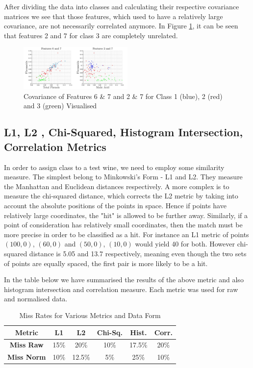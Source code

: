\documentclass[10pt,twocolumn,letterpaper]{article}
\begin{document}
 
After dividing the data into classes and calculating their respective covariance matrices we see that those features, which used to have a relatively large covariance, are not necessarily correlated anymore. In Figure \ref{fig:covIdv}, it can be seen that features 2 and 7 for class 3 are completely unrelated.

\begin{figure}[H]
\centering
\includegraphics[width=0.5\textwidth]{../results/Q1_covIdv}
\caption{Covariance of Features 6 \& 7 and 2 \& 7  for Class 1 (blue), 2 (red) and 3 (green) Visualised \label{fig:covIdv}}
\end{figure}

\subsection{L1, L2 , Chi-Squared, Histogram Intersection, Correlation Metrics}

In order to assign class to a test wine, we need to employ some similarity measure. The simplest belong to Minkowski's Form - L1 and L2. They measure the Manhattan and Euclidean distances respectively. A more complex is to measure the chi-squared distance, which corrects the L2 metric by taking into account the absolute positions of the points in space. Hence if points have relatively large coordinates, the "hit" is allowed to be further away. Similarly, if a point of consideration has relatively small coordinates, then the match must be more precise in order to be classified as a hit. For instance an L1 metric of points $(100,0)$, $(60,0)$ and $(50,0)$, $(10,0)$ would yield 40 for both. However chi-squared distance is 5.05 and 13.7 respectively, meaning even though the two sets of points are equally spaced, the first pair is more likely to be a hit.

In the table below we have summarised the results of the above metric and also histogram intersection and correlation measure. Each metric was used for raw and normalised data.

\begin{table}[H]
\caption{Miss Rates for Various Metrics and Data Form \label{tab:MissMetric}}
\small
\begin{center}
\begin{tabular}{|c| c c c c c|}
\hline
\bf Metric & L1 & L2 & Chi-Sq. &  Hist. & Corr. \\ [0.5ex]
\hline
\bf Miss Raw & 15\% &20\%  & 10\% & 17.5\% & 20\% \\ [0.5ex]
\hline
\bf Miss Norm & 10\% & 12.5\% & 5\% & 25\% & 10\% \\ [0.5ex]
\hline
\end{tabular}
\end{center}
\end{table}
\end{document}
